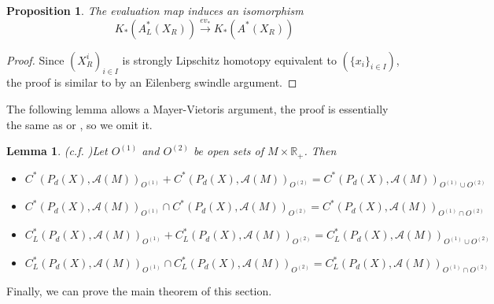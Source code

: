 \documentclass{article}
\theoremstyle{plain}
\newtheorem{lemma}[theorem]{Lemma}
\newtheorem{proposition}[theorem]{Proposition}
\theoremstyle{definition}
\theoremstyle{remark}
\begin{document}
	\begin{proposition}The evaluation map induces an isomorphism
		$$K_{*}(A_L^*(X_R)) \xrightarrow{ev_*}K_{*}(A^*(X_R))$$
	\end{proposition}
	\begin{proof}
		Since $(X_R^i)_{i\in I}$ is strongly Lipschitz homotopy equivalent to $(\{x_i\}_{i\in I})$, the proof is similar to \cite[Lemma~6.4]{yu2000coarse} by an Eilenberg swindle argument.
	\end{proof}
	The following lemma allows a Mayer-Vietoris argument, the proof is essentially the same as \cite[Lemma~6.11]{guo2024hilbert} or \cite[Lemma~6.12]{guo2024bott}, so we omit it.
	\begin{lemma}(c.f. \cite[Lemma 6.11]{guo2024hilbert})\label{glueopenset}
		Let $O^{(1)}$ and $O^{(2)}$ be open sets of $M\times\mathbb R_+$. Then
		\begin{itemize}
			\item[(1)] $C^*(P_d(X),\mathcal A(M))_{O^{(1)}}+C^*(P_d(X),\mathcal A(M))_{O^{(2)}}=C^*(P_d(X),\mathcal A(M))_{O^{(1)}\cup O^{(2)}}$
			\item[(2)] $C^*(P_d(X),\mathcal A(M))_{O^{(1)}}\cap C^*(P_d(X),\mathcal A(M))_{O^{(2)}}=C^*(P_d(X),\mathcal A(M))_{O^{(1)}\cap O^{(2)}}$
			\item[(3)] $C^*_L(P_d(X),\mathcal A(M))_{O^{(1)}}+C^*_L(P_d(X),\mathcal A(M))_{O^{(2)}}=C^*_L(P_d(X),\mathcal A(M))_{O^{(1)}\cup O^{(2)}}$
			\item[(4)] $C^*_L(P_d(X),\mathcal A(M))_{O^{(1)}}\cap C^*_L(P_d(X),\mathcal A(M))_{O^{(2)}}=C^*_L(P_d(X),\mathcal A(M))_{O^{(1)}\cap O^{(2)}}$
		\end{itemize}
	\end{lemma}
	Finally, we can prove the main theorem of this section.
\end{document}
